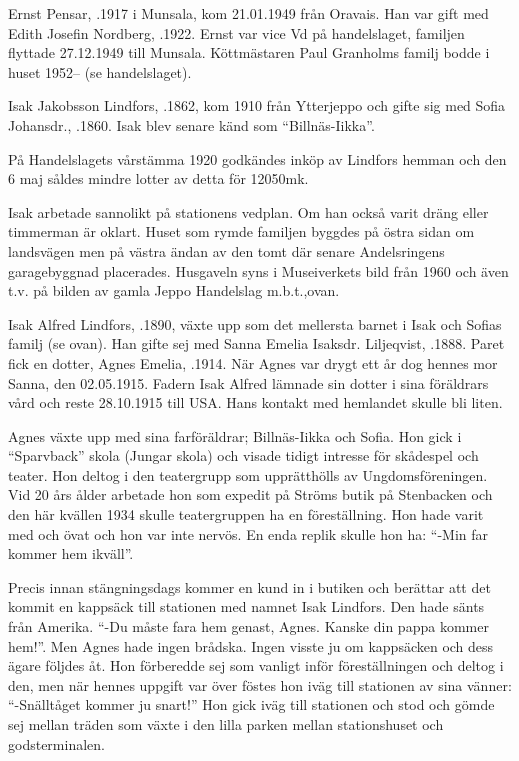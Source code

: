 Ernst Pensar, .1917 i Munsala, kom 21.01.1949 från Oravais. Han var gift med Edith Josefin Nordberg, .1922. Ernst var vice Vd på handelslaget, familjen flyttade 27.12.1949 till Munsala. Köttmästaren Paul Granholms familj bodde i huset 1952--  (se handelslaget).


Isak Jakobsson Lindfors, .1862, kom 1910 från Ytterjeppo och gifte sig med Sofia Johansdr., .1860. Isak blev senare känd som ``Billnäs-Iikka''.

På Handelslagets vårstämma 1920 godkändes inköp av Lindfors hemman och den 6 maj såldes mindre lotter av detta för 12050mk.

Isak arbetade sannolikt på stationens vedplan. Om han också varit dräng eller timmerman är oklart. Huset som rymde familjen byggdes på östra sidan om landsvägen men på västra ändan av den tomt där senare Andelsringens garagebyggnad placerades. Husgaveln syns i Museiverkets bild från 1960 och även t.v. på bilden av gamla Jeppo Handelslag m.b.t.,ovan.
\begin{jhchildren}
  \item {}
  \item {}
  \item {}
\end{jhchildren}

Isak Alfred Lindfors, .1890,  växte upp som det mellersta barnet i Isak och Sofias familj (se ovan). Han gifte sej med Sanna Emelia Isaksdr. Liljeqvist, .1888. Paret fick en dotter, Agnes Emelia, .1914. När Agnes var drygt ett år dog hennes mor Sanna, den 02.05.1915. Fadern Isak Alfred lämnade sin dotter i sina föräldrars vård och reste 28.10.1915 till USA. Hans kontakt med hemlandet skulle bli liten.

Agnes växte upp med sina farföräldrar; Billnäs-Iikka och Sofia. Hon gick i ``Sparvback'' skola (Jungar skola) och visade tidigt intresse för skådespel och teater. Hon deltog i den teatergrupp som upprätthölls av Ungdomsföreningen. Vid 20 års ålder arbetade hon som expedit på Ströms butik på Stenbacken och den här kvällen 1934 skulle teatergruppen ha en föreställning. Hon hade varit med och övat och hon var inte nervös. En enda replik skulle hon ha: ``-Min far kommer hem ikväll''.

Precis innan stängningsdags kommer en kund in i butiken och berättar att det kommit en kappsäck till stationen med namnet Isak Lindfors. Den hade sänts från Amerika. ``-Du måste fara hem genast, Agnes. Kanske din pappa kommer hem!''.  Men Agnes hade ingen brådska. Ingen visste ju om kappsäcken och dess ägare följdes åt. Hon förberedde sej som vanligt inför föreställningen och deltog i den, men när hennes uppgift var över föstes hon iväg till stationen av sina vänner: ``-Snälltåget kommer ju snart!'' Hon gick iväg till stationen och stod och gömde sej mellan träden som växte i den lilla parken mellan stationshuset och godsterminalen.

